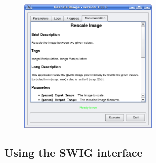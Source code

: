 \begin{figure}[h]
  \center
  \includegraphics[width=0.6\textwidth]{../Art/QtImages/rescale_documentation.png}
  \label{fig:rescaleDocumentation}
\end{figure}

\subsection{Using the SWIG interface}

